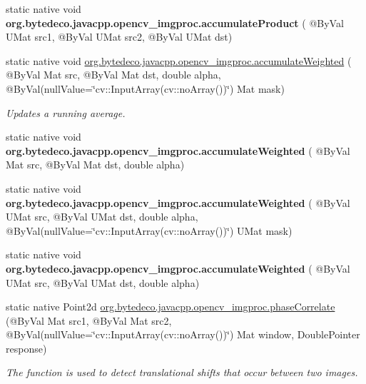 \begin{DoxyCompactItemize}
static native void {\bfseries org.\+bytedeco.\+javacpp.\+opencv\+\_\+imgproc.\+accumulate\+Product} ( @By\+Val U\+Mat src1, @By\+Val U\+Mat src2, @By\+Val U\+Mat dst)
\item 
static native void \hyperlink{group__imgproc__motion_gaa66187536d891c9d8ceacafa73d2d247}{org.\+bytedeco.\+javacpp.\+opencv\+\_\+imgproc.\+accumulate\+Weighted} ( @By\+Val Mat src, @By\+Val Mat dst, double alpha, @By\+Val(null\+Value=\char`\"{}cv\+::\+Input\+Array(cv\+::no\+Array())\char`\"{}) Mat mask)
\begin{DoxyCompactList}\small\item\em Updates a running average. \end{DoxyCompactList}\item 
\mbox{\label{group__imgproc__motion_ga9c0a8b74a9cb30008527d2c48795de40}} 
static native void {\bfseries org.\+bytedeco.\+javacpp.\+opencv\+\_\+imgproc.\+accumulate\+Weighted} ( @By\+Val Mat src, @By\+Val Mat dst, double alpha)
\item 
\mbox{\label{group__imgproc__motion_ga91ac145cc7aec87fe252832fd404a08e}} 
static native void {\bfseries org.\+bytedeco.\+javacpp.\+opencv\+\_\+imgproc.\+accumulate\+Weighted} ( @By\+Val U\+Mat src, @By\+Val U\+Mat dst, double alpha, @By\+Val(null\+Value=\char`\"{}cv\+::\+Input\+Array(cv\+::no\+Array())\char`\"{}) U\+Mat mask)
\item 
\mbox{\label{group__imgproc__motion_ga515e48d6e7e1d8cd98a114a31b0fc40d}} 
static native void {\bfseries org.\+bytedeco.\+javacpp.\+opencv\+\_\+imgproc.\+accumulate\+Weighted} ( @By\+Val U\+Mat src, @By\+Val U\+Mat dst, double alpha)
\item 
static native Point2d \hyperlink{group__imgproc__motion_gaa6db080ff5a1fc47bf09771158c47abb}{org.\+bytedeco.\+javacpp.\+opencv\+\_\+imgproc.\+phase\+Correlate} (@By\+Val Mat src1, @By\+Val Mat src2, @By\+Val(null\+Value=\char`\"{}cv\+::\+Input\+Array(cv\+::no\+Array())\char`\"{}) Mat window, Double\+Pointer response)
\begin{DoxyCompactList}\small\item\em The function is used to detect translational shifts that occur between two images. \end{DoxyCompactList}\item 
\mbox{\label{group__imgproc__motion_gaadc1ecc1959242f195fa2b7f1cf0d9c3}} 

\end{DoxyCompactItemize}
